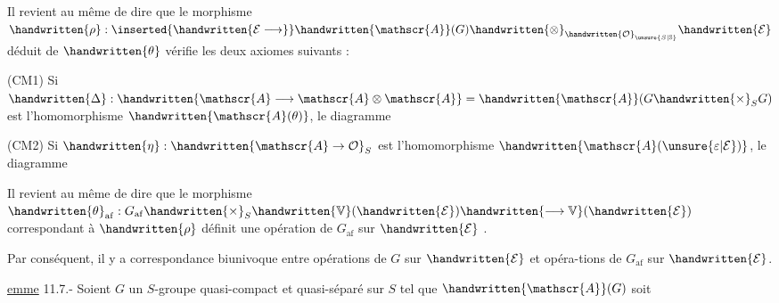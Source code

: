Il revient au même de dire que le morphisme $\handwritten{\rho}:\inserted{\handwritten{\mathcal{E}\longrightarrow}}\handwritten{\mathscr{A}}(G)\handwritten{\otimes}_{\handwritten{\mathcal{O}}_{\unsure{S|\mathbb{S}}}}\handwritten{\mathcal{E}}$ déduit de $\handwritten{\theta}$ vérifie les deux axiomes suivants :

(CM1) Si $\handwritten{\Delta}:\handwritten{\mathscr{A}\longrightarrow\mathscr{A}\otimes\mathscr{A}}=\handwritten{\mathscr{A}}(G\handwritten{\times}_S G)$ est l'homomorphisme $\handwritten{\mathscr{A}(\theta)}$, le diagramme

(CM2) Si $\handwritten{\eta}:\handwritten{\mathscr{A}\to\mathcal{O}}_S$ est l'homomorphisme $\handwritten{\mathscr{A}(\unsure{\varepsilon|\mathcal{E}})}$, le diagramme

Il revient au même de dire que le morphisme $\handwritten{\theta}_{\mathrm{af}}:G_{\mathrm{af}}\handwritten{\times}_S\handwritten{\mathbb{V}}(\handwritten{\mathcal{E}})\handwritten{\longrightarrow\mathbb{V}}(\handwritten{\mathcal{E}})$ correspondant à $\handwritten{\rho}$ définit une opération de $G_{\mathrm{af}}$ sur $\handwritten{\mathcal{E}}$  .

Par conséquent, il y a correspondance biunivoque entre opérations de $G$ sur $\handwritten{\mathcal{E}}$ et opéra-\linebreak tions de $G_{\mathrm{af}}$ sur $\handwritten{\mathcal{E}}$.

\uline{emme} 11.7.- Soient $G$ un $S$-groupe quasi-compact et quasi-séparé sur $S$\handwritten{,} tel que $\handwritten{\mathscr{A}}(G)$ soit
